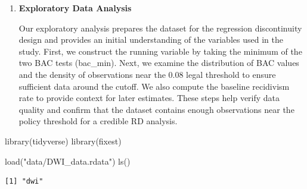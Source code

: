 \documentclass[
  letterpaper,
  DIV=11,
  numbers=noendperiod]{scrartcl}
\newenvironment{Shaded}{\begin{snugshade}}{\end{snugshade}}
\newcommand{\FunctionTok}[1]{\textcolor[rgb]{0.28,0.35,0.67}{#1}}
\newcommand{\NormalTok}[1]{\textcolor[rgb]{0.00,0.23,0.31}{#1}}
\newcommand{\StringTok}[1]{\textcolor[rgb]{0.13,0.47,0.30}{#1}}
\begin{document}
\begin{enumerate}
  We use the DWI\_Data.rdata subset of Hansen's Washington State
  impaired-driving data, which contains 214,558 traffic stops in our
  working sample and is designed to study whether harsher punishment
  affects later recidivism. The key variables are the two BAC measures,
  \texttt{bac1} and \texttt{bac2}, the outcome \texttt{recidivism}, and
  predetermined covariates including \texttt{male}, \texttt{white},
  \texttt{aged}, \texttt{acc}, and \texttt{year}. Each driver receives
  two BAC tests, so to construct a single running variable for the RD
  design we use \texttt{bac\_min\ =\ pmin(bac1,\ bac2)}. This gives one
  BAC value per stop, avoids treating the same incident as two
  observations, and uses a conservative classification rule when
  determining whether a driver falls above or below the 0.08 legal
  threshold. In the sample, all key analysis variables have zero
  missingness, so no additional exclusions are required.
\item
  \textbf{Exploratory Data Analysis}

  Our exploratory analysis prepares the dataset for the regression
  discontinuity design and provides an initial understanding of the
  variables used in the study. First, we construct the running variable
  by taking the minimum of the two BAC tests (bac\_min). Next, we
  examine the distribution of BAC values and the density of observations
  near the 0.08 legal threshold to ensure sufficient data around the
  cutoff. We also compute the baseline recidivism rate to provide
  context for later estimates. These steps help verify data quality and
  confirm that the dataset contains enough observations near the policy
  threshold for a credible RD analysis.
\end{enumerate}

\begin{Shaded}
\begin{Highlighting}[]
\FunctionTok{library}\NormalTok{(tidyverse)}
\FunctionTok{library}\NormalTok{(fixest)}
\end{Highlighting}
\end{Shaded}

\begin{Shaded}
\begin{Highlighting}[]
\FunctionTok{load}\NormalTok{(}\StringTok{"data/DWI\_data.rdata"}\NormalTok{)}
\FunctionTok{ls}\NormalTok{()}
\end{Highlighting}
\end{Shaded}

\begin{verbatim}
[1] "dwi"
\end{verbatim}
\end{document}
